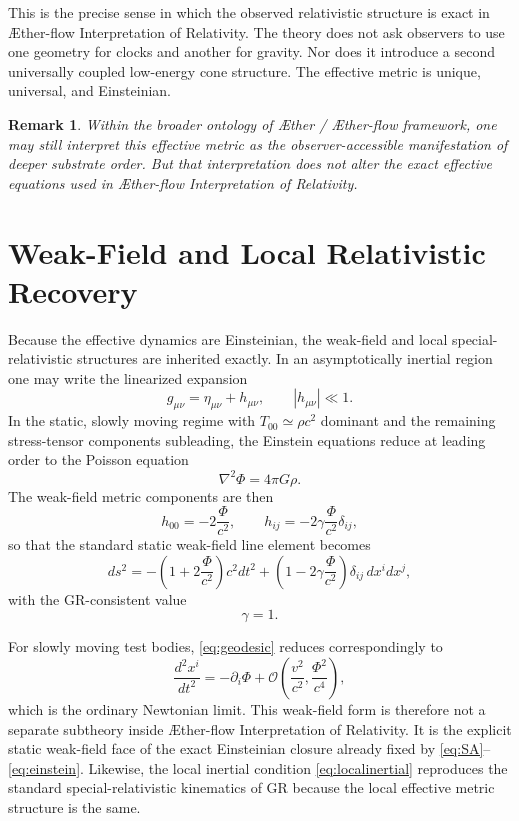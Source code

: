 \documentclass[11pt]{article}
\newcommand{\Aether}{\AE{}ther}
\newcommand{\Aflow}{\AE{}ther-flow}
\newcommand{\TheoryName}{\Aflow{} Interpretation of Relativity}
\newcommand{\TheoryProgram}{\Aether{} / \Aflow{} framework}
\newcommand{\Ph}{\Phi}
\newtheorem{remark}{Remark}
\begin{document}
This is the precise sense in which the observed relativistic structure is exact in \TheoryName{}. The theory does not ask observers to use one geometry for clocks and another for gravity. Nor does it introduce a second universally coupled low-energy cone structure. The effective metric is unique, universal, and Einsteinian.

\begin{remark}
Within the broader ontology of \TheoryProgram{}, one may still interpret this effective metric as the observer-accessible manifestation of deeper substrate order. But that interpretation does not alter the exact effective equations used in \TheoryName{}.
\end{remark}

\section{Weak-Field and Local Relativistic Recovery}

Because the effective dynamics are Einsteinian, the weak-field and local special-relativistic structures are inherited exactly. In an asymptotically inertial region one may write the linearized expansion
\begin{equation}
g_{\mu\nu}=\eta_{\mu\nu}+h_{\mu\nu},
\qquad
|h_{\mu\nu}|\ll 1.
\label{eq:linearizedmetric}
\end{equation}
In the static, slowly moving regime with \(T_{00}\simeq \rho c^2\) dominant and the remaining stress-tensor components subleading, the Einstein equations reduce at leading order to the Poisson equation
\begin{equation}
\nabla^2 \Phi = 4\pi G \rho.
\label{eq:poisson}
\end{equation}
The weak-field metric components are then
\begin{equation}
h_{00}=-2\frac{\Phi}{c^2},
\qquad
h_{ij}=-2\gamma\frac{\Phi}{c^2}\delta_{ij},
\label{eq:hweakfield}
\end{equation}
so that the standard static weak-field line element becomes
\begin{equation}
ds^2
=
-\left(1+2\frac{\Ph}{c^2}\right)c^2dt^2
+
\left(1-2\gamma\frac{\Ph}{c^2}\right)\delta_{ij}\,dx^i dx^j,
\label{eq:weakfield}
\end{equation}
with the GR-consistent value
\begin{equation}
\gamma = 1.
\label{eq:gamma}
\end{equation}

For slowly moving test bodies, \eqref{eq:geodesic} reduces correspondingly to
\begin{equation}
\frac{d^2x^i}{dt^2}
=
-\partial_i \Phi
+ \mathcal{O}\!\left(\frac{v^2}{c^2},\frac{\Phi^2}{c^4}\right),
\label{eq:newtonianlimit}
\end{equation}
which is the ordinary Newtonian limit. This weak-field form is therefore not a separate subtheory inside \TheoryName{}. It is the explicit static weak-field face of the exact Einsteinian closure already fixed by \eqref{eq:SA}--\eqref{eq:einstein}. Likewise, the local inertial condition \eqref{eq:localinertial} reproduces the standard special-relativistic kinematics of GR because the local effective metric structure is the same.
\end{document}
